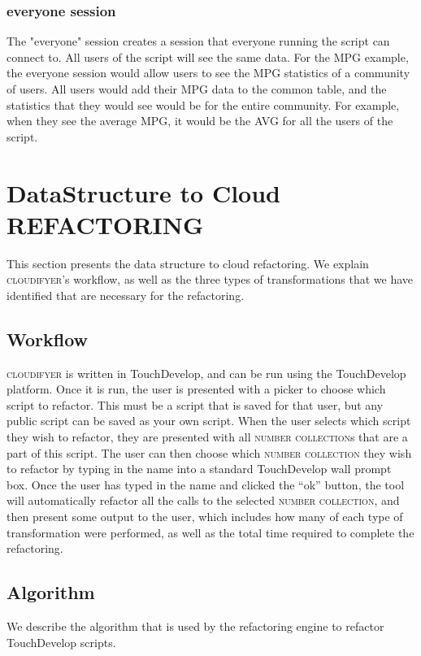 \documentclass{sigplanconf}
\begin{document}
\subsubsection{everyone session}
The "everyone" session creates a session that everyone running the script can connect to.  All users of the script will see the same data.  For the MPG example, the everyone session would allow users to see the MPG statistics of a community of users.  All users would add their MPG data to the common table, and the statistics that they would see would be for the entire community.  For example, when they see the average MPG, it would be the AVG for all the users of the script.



  
\section{DataStructure to Cloud REFACTORING}
\label{sec:Refactoring}
This section presents the data structure to cloud refactoring.  We explain \textsc{cloudifyer}'s workflow, as well as the three types of transformations that we have identified that are necessary for the refactoring. 

\subsection{Workflow}
\textsc{cloudifyer} is written in TouchDevelop, and can be run using the TouchDevelop platform.  Once it is run, the user is presented with a picker to choose which script to refactor.  This must be a script that is saved for that user, but any public script can be saved as your own script. When the user selects which script they wish to refactor, they are presented with all \textsc{number collection}s that are a part of this script.  The user can then choose which \textsc{number collection} they wish to refactor by typing in the name into a standard TouchDevelop wall prompt box. Once the user has typed in the name and clicked the ``ok'' button, the tool will automatically refactor all the calls to the selected \textsc{number collection}, and then present some output to the user, which includes how many of each type of transformation were performed, as well as the total time required to complete the refactoring. 


\subsection{Algorithm}
We describe the algorithm that is used by the refactoring engine to refactor TouchDevelop scripts.   
\end{document}
